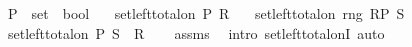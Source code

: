 \begin{isabellebody}
\ \ \ P\ {\isacharcolon}{\kern0pt}{\isacharcolon}{\kern0pt}\ {\isachardoublequoteopen}set\ {\isasymRightarrow}\ bool{\isachardoublequoteclose}\isanewline
\ \ \ {\isachardoublequoteopen}set{\isacharunderscore}{\kern0pt}left{\isacharunderscore}{\kern0pt}total{\isacharunderscore}{\kern0pt}on\ P\ R{\isachardoublequoteclose}\isanewline
\ \ \ {\isachardoublequoteopen}set{\isacharunderscore}{\kern0pt}left{\isacharunderscore}{\kern0pt}total{\isacharunderscore}{\kern0pt}on\ {\isacharparenleft}{\kern0pt}rng\ {\isacharparenleft}{\kern0pt}R{\isasymrestriction}\isactrlbsub P\isactrlesub {\isacharparenright}{\kern0pt}{\isacharparenright}{\kern0pt}\ S{\isachardoublequoteclose}\isanewline
\ \ \ {\isachardoublequoteopen}set{\isacharunderscore}{\kern0pt}left{\isacharunderscore}{\kern0pt}total{\isacharunderscore}{\kern0pt}on\ P\ {\isacharparenleft}{\kern0pt}S\ {\isasymcirc}\ R{\isacharparenright}{\kern0pt}{\isachardoublequoteclose}\isanewline
%
\isadelimproof
\ \ %
\endisadelimproof
%
\isatagproof
{}\isamarkupfalse%
\ assms\ \isamarkupfalse%
\ {\isacharparenleft}{\kern0pt}intro\ set{\isacharunderscore}{\kern0pt}left{\isacharunderscore}{\kern0pt}total{\isacharunderscore}{\kern0pt}onI{\isacharparenright}{\kern0pt}\ auto%
\endisatagproof
{\isafoldproof}%
%
\isadelimproof
\isanewline
%
\endisadelimproof
\isanewline
%
\isadelimtheory
\isanewline
%
\endisadelimtheory
%
\isatagtheory
{}\isamarkupfalse%
%
\endisatagtheory
{\isafoldtheory}%
%
\isadelimtheory
%
\endisadelimtheory
%
\end{isabellebody}%
\endinput
